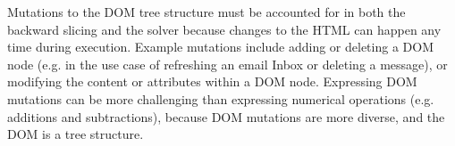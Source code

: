 Mutations to the DOM tree structure must be accounted for in both the backward slicing and the solver because changes to the HTML can happen any time during execution.
Example mutations include adding or deleting a DOM node (e.g. in the use case of refreshing an email Inbox or deleting a message), or modifying the content or attributes within a DOM node.  
Expressing DOM mutations can be more challenging than expressing numerical operations (e.g. additions and subtractions), because DOM mutations are more diverse, and the DOM is a tree structure.


